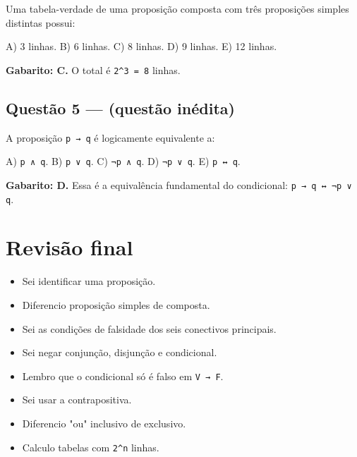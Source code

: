 \documentclass[11pt,a4paper]{article}
\begin{document}
Uma tabela-verdade de uma proposição composta com três proposições simples distintas possui:

A) 3 linhas. B) 6 linhas. C) 8 linhas. D) 9 linhas. E) 12 linhas.

\begin{alerta}
\textbf{Gabarito: C.} O total é \texttt{2\textasciicircum{}3 = 8} linhas.
\end{alerta}

\subsection*{Questão 5 — (questão inédita)}

A proposição \texttt{p → q} é logicamente equivalente a:

A) \texttt{p ∧ q}. B) \texttt{p ∨ q}. C) \texttt{¬p ∧ q}. D) \texttt{¬p ∨ q}. E) \texttt{p ↔ q}.

\begin{alerta}
\textbf{Gabarito: D.} Essa é a equivalência fundamental do condicional: \texttt{p → q ↔ ¬p ∨ q}.
\end{alerta}

\section*{Revisão final}

\begin{itemize}
  \item[$\square$] Sei identificar uma proposição.
  \item[$\square$] Diferencio proposição simples de composta.
  \item[$\square$] Sei as condições de falsidade dos seis conectivos principais.
  \item[$\square$] Sei negar conjunção, disjunção e condicional.
  \item[$\square$] Lembro que o condicional só é falso em \texttt{V → F}.
  \item[$\square$] Sei usar a contrapositiva.
  \item[$\square$] Diferencio "ou" inclusivo de exclusivo.
  \item[$\square$] Calculo tabelas com \texttt{2\textasciicircum{}n} linhas.
\end{itemize}
\end{document}
